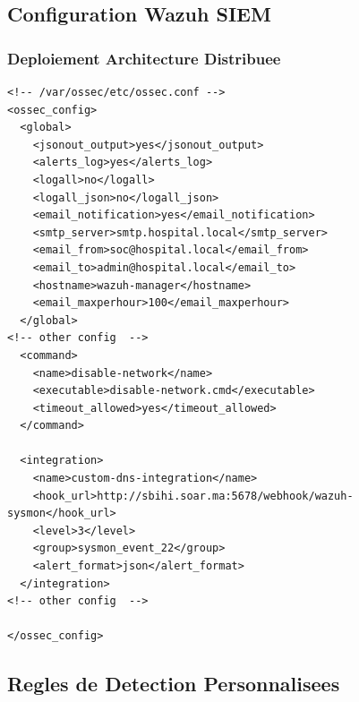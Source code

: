 \subsection{Configuration Wazuh SIEM}

\subsubsection{Deploiement Architecture Distribuee}


\begin{lstlisting}[style=xmlstyle,caption=Configuration Wazuh Manager principal]
<!-- /var/ossec/etc/ossec.conf -->
<ossec_config>
  <global>
    <jsonout_output>yes</jsonout_output>
    <alerts_log>yes</alerts_log>
    <logall>no</logall>
    <logall_json>no</logall_json>
    <email_notification>yes</email_notification>
    <smtp_server>smtp.hospital.local</smtp_server>
    <email_from>soc@hospital.local</email_from>
    <email_to>admin@hospital.local</email_to>
    <hostname>wazuh-manager</hostname>
    <email_maxperhour>100</email_maxperhour>
  </global>
<!-- other config  -->
  <command>
    <name>disable-network</name>
    <executable>disable-network.cmd</executable> 
    <timeout_allowed>yes</timeout_allowed>
  </command>

  <integration>
    <name>custom-dns-integration</name>
    <hook_url>http://sbihi.soar.ma:5678/webhook/wazuh-sysmon</hook_url>
    <level>3</level>
    <group>sysmon_event_22</group>
    <alert_format>json</alert_format>
  </integration>
<!-- other config  -->

</ossec_config>
\end{lstlisting}

\subsection{Regles de Detection Personnalisees}

